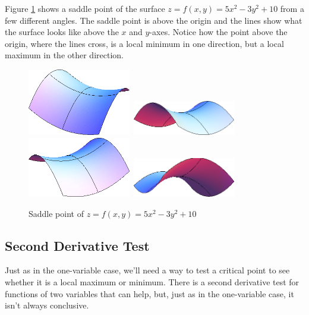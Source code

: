 Figure \ref{fig:4-3-saddle} shows a saddle point of the surface $z = f(x, y) = 5x^2-3y^2+10$ from a few different angles. The saddle point is above the origin and the lines show what the surface looks like above the $x$ and $y$-axes. Notice how the point above the origin, where the lines cross, is a local minimum in one direction, but a local maximum in the other direction.

\begin{figure}
  \centering
    \includegraphics[width=0.4\textwidth]{img/chap4/image046.png}~\includegraphics[width=0.4\textwidth]{img/chap4/image047.png}\\
    \includegraphics[width=0.4\textwidth]{img/chap4/image048.png}~\includegraphics[width=0.4\textwidth]{img/chap4/image049.png}\\
    \caption{Saddle point of $z=f(x,y)=5x^2-3y^2+10$}
    \label{fig:4-3-saddle}
\end{figure}

\subsection{Second Derivative Test}
Just as in the one-variable case, we'll need a way to test a critical point to see whether it is a local maximum or minimum. There is a second derivative test for functions of two variables that can help, but, just as in the one-variable case, it isn't always conclusive.

